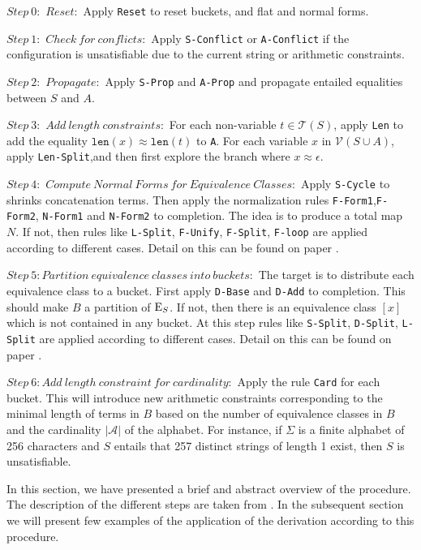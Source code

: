 \begin{description}			
	\item$Step\ 0:$ $Reset:$ Apply \texttt{Reset} to reset buckets, and flat and normal forms.
	\item$Step\ 1:$ $Check\ for\ conflicts:$ Apply \texttt{S-Conflict} or \texttt{A-Conflict} if the configuration is unsatisfiable due to the current string or arithmetic constraints.
	\item$Step\ 2:$ $Propagate:$ Apply \texttt{S-Prop} and \texttt{A-Prop} and propagate entailed equalities between $S$ and $A$.
	\item$Step\ 3:$  $Add\ length\ constraints:$ For each non-variable $t \in \mathcal{T}(S)$, apply \texttt{Len} to add the equality $ \texttt{len}(x)\approx \texttt{len}(t)$ to \texttt{A}.  For each variable $x$ in $\mathcal{V}(S \cup A)$, apply \texttt{Len-Split},and then first explore the branch where $x \approx \epsilon$.
	\item$Step\ 4:$ $Compute\ Normal\ Forms\ for\ Equivalence\ Classes:$ Apply \texttt{S-Cycle} to shrinks concatenation terms. Then apply the normalization rules \texttt{F-Form1},\texttt{F-Form2}, \texttt{N-Form1} and \texttt{N-Form2} to completion. The idea is to produce a total map $N$. If not, then rules like \texttt{L-Split}, \texttt{F-Unify}, \texttt{F-Split}, \texttt{F-loop} are applied according to different cases. Detail on this can be found on paper \cite{main_phd}.
		
	\item$Step\ 5: Partition\ equivalence\ classes\ into\ buckets:$ The target is to distribute each equivalence class to a bucket. First apply \texttt{D-Base} and \texttt{D-Add} to completion. This should make $B$ a partition of \( \textnormal{E}_S \). If not, then there is an equivalence class $[x]$ which is not contained in any bucket. At this step rules like \texttt{S-Split}, \texttt{D-Split}, \texttt{L-Split} are applied according to different cases. Detail on this can be found on paper \cite{main_phd}.
	\item$Step\ 6:Add\ length\ constraint\ for\ cardinality:$ Apply the rule \texttt{Card} for each bucket. This will introduce new arithmetic constraints corresponding to the minimal length of terms in $B$ based on the number of equivalence classes in $B$ and the cardinality $| \mathcal{A}|$ of the alphabet. For instance, if $\Sigma$ is a finite alphabet of 256 characters and $S$ entails that 257 distinct strings of length 1 exist, then $S$ is unsatisfiable. 
\end{description}
    In this section, we have presented a brief and abstract overview of the procedure. The description of the different steps are taken from \cite{main_phd}. In the subsequent section we will present few examples of the application of the derivation according to this procedure.
